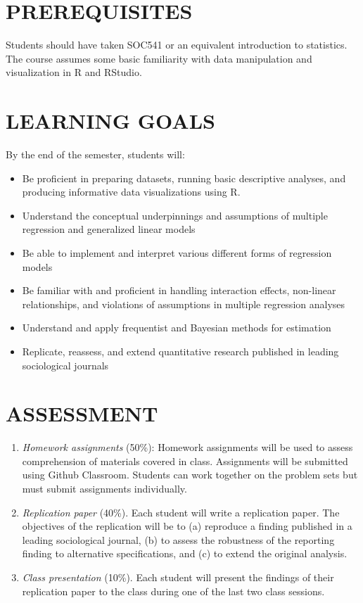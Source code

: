 \documentclass[
  10pt,
]{article}
\providecommand{\tightlist}{%
  \setlength{\itemsep}{0pt}\setlength{\parskip}{0pt}}
\begin{document}
\hypertarget{prerequisites}{%
\section{PREREQUISITES}\label{prerequisites}}

Students should have taken SOC541 or an equivalent introduction to
statistics. The course assumes some basic familiarity with data
manipulation and visualization in R and RStudio.

\hypertarget{learning-goals}{%
\section{LEARNING GOALS}\label{learning-goals}}

By the end of the semester, students will:

\begin{itemize}
\tightlist
\item
  Be proficient in preparing datasets, running basic descriptive
  analyses, and producing informative data visualizations using R.
\item
  Understand the conceptual underpinnings and assumptions of multiple
  regression and generalized linear models
\item
  Be able to implement and interpret various different forms of
  regression models
\item
  Be familiar with and proficient in handling interaction effects,
  non-linear relationships, and violations of assumptions in multiple
  regression analyses
\item
  Understand and apply frequentist and Bayesian methods for estimation
\item
  Replicate, reassess, and extend quantitative research published in
  leading sociological journals
\end{itemize}

\hypertarget{assessment}{%
\section{ASSESSMENT}\label{assessment}}

\begin{enumerate}
\def\labelenumi{\arabic{enumi}.}
\item
  \emph{Homework assignments} (50\%): Homework assignments will be used
  to assess comprehension of materials covered in class. Assignments
  will be submitted using Github Classroom. Students can work together
  on the problem sets but must submit assignments individually.
\item
  \emph{Replication paper} (40\%). Each student will write a replication
  paper. The objectives of the replication will be to (a) reproduce a
  finding published in a leading sociological journal, (b) to assess the
  robustness of the reporting finding to alternative specifications, and
  (c) to extend the original analysis.
\item
  \emph{Class presentation} (10\%). Each student will present the
  findings of their replication paper to the class during one of the
  last two class sessions.
\end{enumerate}
\end{document}
